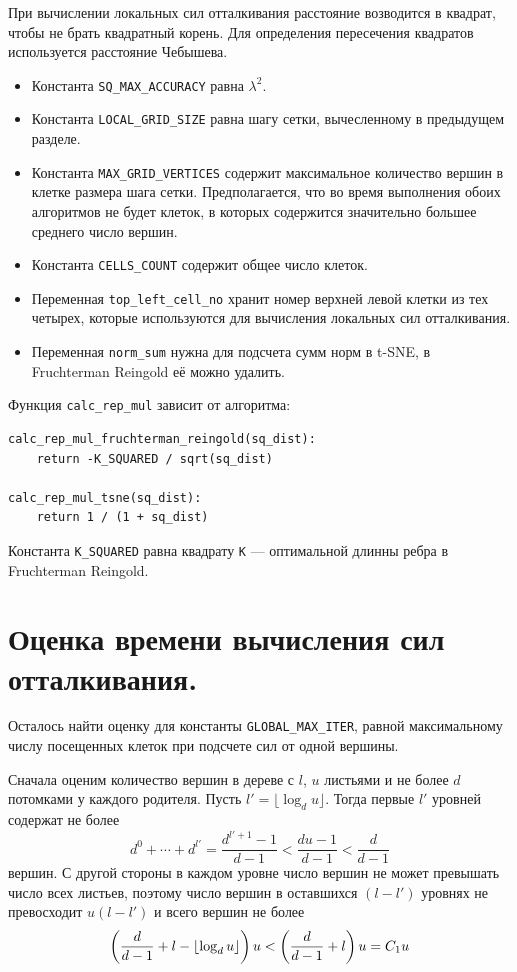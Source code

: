 При вычислении локальных сил отталкивания расстояние возводится в квадрат, чтобы не брать квадратный корень.  Для определения пересечения квадратов используется расстояние Чебышева.

\begin{itemize}
\item Константа \texttt{SQ\_MAX\_ACCURACY} равна $\lambda^2$.
\item Константа \texttt{LOCAL\_GRID\_SIZE} равна шагу сетки, вычесленному в предыдущем разделе.
\item Константа \texttt{MAX\_GRID\_VERTICES} содержит максимальное количество вершин в клетке размера шага сетки. Предполагается, что во время выполнения обоих алгоритмов не будет клеток, в которых содержится значительно большее среднего число вершин.
\item Константа  \texttt{CELLS\_COUNT} содержит общее число клеток.
\item Переменная \texttt{top\_left\_cell\_no} хранит номер верхней левой клетки из тех четырех, которые используются для вычисления локальных сил отталкивания.
\item Переменная \texttt{norm\_sum} нужна для подсчета сумм норм в t-SNE, в Fruchterman Reingold её можно удалить.
\end{itemize}

Функция \texttt{calc\_rep\_mul} зависит от алгоритма:
\begin{verbatim}
calc_rep_mul_fruchterman_reingold(sq_dist):
    return -K_SQUARED / sqrt(sq_dist)

calc_rep_mul_tsne(sq_dist):
    return 1 / (1 + sq_dist)
\end{verbatim}

Константа \texttt{K\_SQUARED} равна квадрату \texttt{K} --- оптимальной длинны ребра в Fruchterman Reingold.

\section{Оценка времени вычисления сил отталкивания.}
\label{sec:repulsion_time}

Осталось найти оценку для константы \texttt{GLOBAL\_MAX\_ITER}, равной максимальному числу посещенных клеток при подсчете сил от одной вершины.

Сначала оценим количество вершин в дереве с $l$, $u$ листьями и не более $d$ потомками у каждого родителя. Пусть $l' = \lfloor\log_d u\rfloor$. Тогда первые $l'$ уровней содержат не более
$$d^0 + \cdots + d^{l'} = \frac{d^{l' + 1} - 1}{d - 1} < \frac{d u - 1}{d - 1} < \frac{d}{d - 1}$$
вершин. С другой стороны в каждом уровне число вершин не может превышать число всех листьев, поэтому число вершин в оставшихся $(l - l')$ уровнях не превосходит $u (l - l')$ и всего вершин не более
\begin{equation}
  \left(\frac{d}{d - 1} + l - \lfloor\log_d u\rfloor\right) u < \left(\frac{d}{d - 1} + l\right)u = C_1 u
  \label{eq:leafs_count}
\end{equation}

